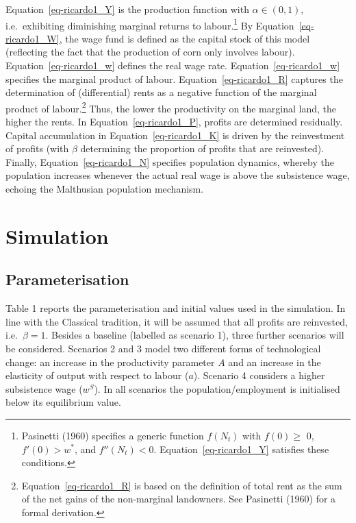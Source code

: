\documentclass[
  letterpaper,
  DIV=11,
  numbers=noendperiod]{scrreprt}
\begin{document}
Equation~\ref{eq-ricardo1_Y} is the production function with
\(\alpha \in (0,1)\), i.e.~exhibiting diminishing marginal returns to
labour.\footnote{Pasinetti (1960) specifies a generic function
  \(f(N_t)\) with \(f(0) \geq\) 0, \(f'(0) > w^*\), and
  \(f''(N_t) < 0\). Equation~\ref{eq-ricardo1_Y} satisfies these
  conditions.} By Equation~\ref{eq-ricardo1_W}, the wage fund is defined
as the capital stock of this model (reflecting the fact that the
production of corn only involves labour). Equation~\ref{eq-ricardo1_w}
defines the real wage rate. Equation~\ref{eq-ricardo1_w} specifies the
marginal product of labour. Equation~\ref{eq-ricardo1_R} captures the
determination of (differential) rents as a negative function of the
marginal product of labour.\footnote{Equation~\ref{eq-ricardo1_R} is
  based on the definition of total rent as the sum of the net gains of
  the non-marginal landowners. See Pasinetti (1960) for a formal
  derivation.} Thus, the lower the productivity on the marginal land,
the higher the rents. In Equation~\ref{eq-ricardo1_P}, profits are
determined residually. Capital accumulation in
Equation~\ref{eq-ricardo1_K} is driven by the reinvestment of profits
(with \(\beta\) determining the proportion of profits that are
reinvested). Finally, Equation~\ref{eq-ricardo1_N} specifies population
dynamics, whereby the population increases whenever the actual real wage
is above the subsistence wage, echoing the Malthusian population
mechanism.

\section{Simulation}\label{simulation-10}

\subsection{Parameterisation}\label{parameterisation-10}

Table 1 reports the parameterisation and initial values used in the
simulation. In line with the Classical tradition, it will be assumed
that all profits are reinvested, i.e.~\(\beta=1\). Besides a baseline
(labelled as scenario 1), three further scenarios will be considered.
Scenarios 2 and 3 model two different forms of technological change: an
increase in the productivity parameter \(A\) and an increase in the
elasticity of output with respect to labour (\(a\)). Scenario 4
considers a higher subsistence wage (\(w^S\)). In all scenarios the
population/employment is initialised below its equilibrium value.
\end{document}
